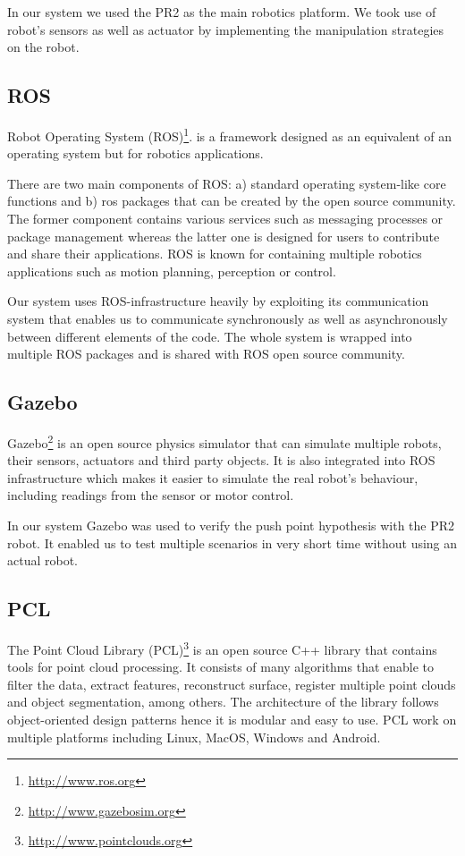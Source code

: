 In our system we used the PR2 as the main robotics platform. We took use of robot's sensors as well as actuator by implementing the manipulation strategies on the robot.

\subsection{ROS}
Robot Operating System (ROS)\footnote{\url{http://www.ros.org}}. is a framework designed as an equivalent of an operating system but for robotics applications. 

There are two main components of ROS: a) standard operating system-like core functions and b) ros packages that can be created by the open source community. The former component contains various services such as messaging processes or package management whereas the latter one is designed for users to contribute and share their applications. ROS is known for containing multiple robotics applications such as motion planning, perception or control.

Our system uses ROS-infrastructure heavily by exploiting its communication system that enables us to communicate synchronously as well as asynchronously between different elements of the code. The whole system is wrapped into multiple ROS packages and is shared with ROS open source community.




\subsection{Gazebo}
Gazebo\footnote{\url{http://www.gazebosim.org}} is an open source physics simulator that can simulate multiple robots, their sensors, actuators and third party objects. It is also integrated into ROS infrastructure which makes it easier to simulate the real robot's behaviour, including readings from the sensor or motor control. 

In our system Gazebo was used to verify the push point hypothesis with the PR2 robot. It enabled us to test multiple scenarios in very short time without using an actual robot.


\subsection{PCL}
The Point Cloud Library (PCL)\footnote{\url{http://www.pointclouds.org}} is an open source C++ library that contains tools for point cloud processing. It consists of many algorithms that enable to filter the data, extract features, reconstruct surface, register multiple point clouds and object segmentation, among others. The architecture of the library follows object-oriented design patterns hence it is modular and easy to use. PCL work on multiple platforms including Linux, MacOS, Windows and Android. 


